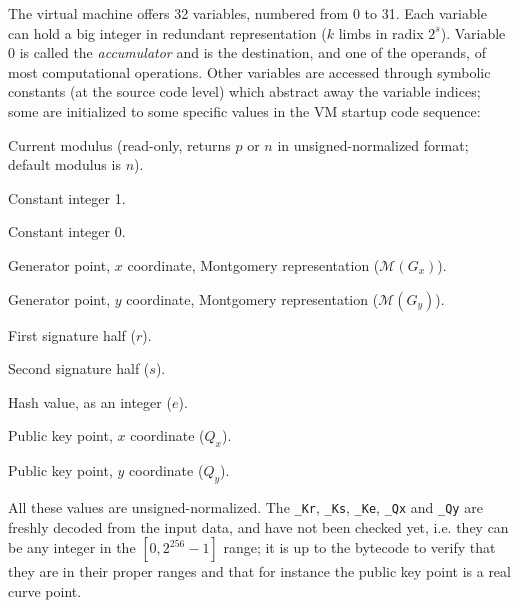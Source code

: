 \documentclass{llncs}
\newcommand{\mont}[1]{\mathcal{M}(#1)}
\begin{document}
The virtual machine offers 32 variables, numbered from 0 to 31. Each
variable can hold a big integer in redundant representation ($k$ limbs
in radix $2^s$). Variable 0 is called the \emph{accumulator} and is the
destination, and one of the operands, of most computational operations.
Other variables are accessed through symbolic constants (at the source
code level) which abstract away the variable indices; some are initialized
to some specific values in the VM startup code sequence:
\newenvironment{codedesc2}
    {\begin{list}
        {}
        {\setlength{\labelwidth}{3.5em}
         \setlength{\labelsep}{0.5em}
         \setlength{\itemsep}{1ex}
         \setlength{\leftmargin}{4em}
         \setlength{\rightmargin}{0em}
         \let\makelabel=\makecodedesclabel
        }
    }
    {\end{list}}
\begin{codedesc2}

    \item[\_M] Current modulus (read-only, returns $p$ or $n$ in
    unsigned-normalized format; default modulus is $n$).

    \item[\_ONE] Constant integer 1.

    \item[\_ZERO] Constant integer 0.

    \item[\_Gx] Generator point, $x$ coordinate, Montgomery
    representation ($\mont{G_x}$).

    \item[\_Gy] Generator point, $y$ coordinate, Montgomery
    representation ($\mont{G_y}$).

    \item[\_Kr] First signature half ($r$).

    \item[\_Ks] Second signature half ($s$).

    \item[\_Ke] Hash value, as an integer ($e$).

    \item[\_Qx] Public key point, $x$ coordinate ($Q_x$).

    \item[\_Qy] Public key point, $y$ coordinate ($Q_y$).

\end{codedesc2}

All these values are unsigned-normalized. The \verb+_Kr+, \verb+_Ks+,
\verb+_Ke+, \verb+_Qx+ and \verb+_Qy+ are freshly decoded from the input
data, and have not been checked yet, i.e. they can be any integer in the
$[0, 2^{256} - 1]$ range; it is up to the bytecode to verify that they
are in their proper ranges and that for instance the public key point is
a real curve point.
\end{document}
